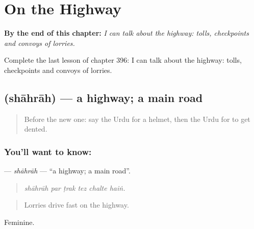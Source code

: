 
\chapter{On the Highway}
\label{ch:ur-on-the-highway}

\begin{chapteropening}
\textbf{By the end of this chapter:} \emph{I can talk about the highway: tolls, checkpoints and convoys of lorries.}

Complete the last lesson of chapter 396: I can talk about the highway: tolls, checkpoints and convoys of lorries.
\end{chapteropening}

\section[\texorpdfstring{\ur{شاہراہ} (shāhrāh)}{شاہراہ (shāhrāh)}]{ (shāhrāh) — a highway; a main road}

\label{lesson:UR-C396-shahrah}



\begin{quote}
Before the new one: say the Urdu for a helmet, then the Urdu for to get dented.
\end{quote}

\subsection*{You'll want to know: }
\textbf{} — \emph{shāhrāh} — \textquotedblleft{}a highway; a main road\textquotedblright{}.

\begin{quote}
     
\end{quote}

\begin{quote}
\emph{shāhrāh par ṭrak tez chalte haiṅ.}
\end{quote}

\begin{quote}
Lorries drive fast on the highway.
\end{quote}

Feminine.

